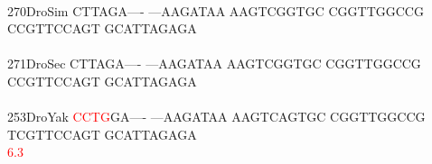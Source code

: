 \documentclass[11pt,twoside,reqno,a4paper]{article}
\begin{document}
{\hspace*{4\charwidth}\hspace*{7\charwidth}\hspace*{1\charwidth}\hspace*{1\charwidth}\hspace*{1\charwidth}\hspace*{1\charwidth}\hspace*{1\charwidth}\hspace*{1\charwidth}\\
270\hspace*{1\charwidth}DroSim	CTTAGA----	---AAGATAA	AAGTCGGTGC	CGGTTGGCCG	CCGTTCCAGT	GCATTAGAGA	\\
\hspace*{4\charwidth}\hspace*{7\charwidth}\hspace*{1\charwidth}\hspace*{1\charwidth}\hspace*{1\charwidth}\hspace*{1\charwidth}\hspace*{1\charwidth}\hspace*{1\charwidth}\\
271\hspace*{1\charwidth}DroSec	CTTAGA----	---AAGATAA	AAGTCGGTGC	CGGTTGGCCG	CCGTTCCAGT	GCATTAGAGA	\\
\hspace*{4\charwidth}\hspace*{7\charwidth}\hspace*{1\charwidth}\hspace*{1\charwidth}\hspace*{1\charwidth}\hspace*{1\charwidth}\hspace*{1\charwidth}\hspace*{1\charwidth}\\
253\hspace*{1\charwidth}DroYak	\textcolor{Red}{C}\textcolor{Red}{C}\textcolor{Red}{T}\textcolor{Red}{G}GA----	---AAGATAA	AAGTCAGTGC	CGGTTGGCCG	TCGTTCCAGT	GCATTAGAGA	\\
\hspace*{4\charwidth}\hspace*{7\charwidth}\hspace*{0\charwidth}\textcolor{Red}{6.3}\hspace*{1\charwidth}\hspace*{1\charwidth}\hspace*{1\charwidth}\hspace*{1\charwidth}\hspace*{1\charwidth}\hspace*{1\charwidth}\\
}
\end{document}
